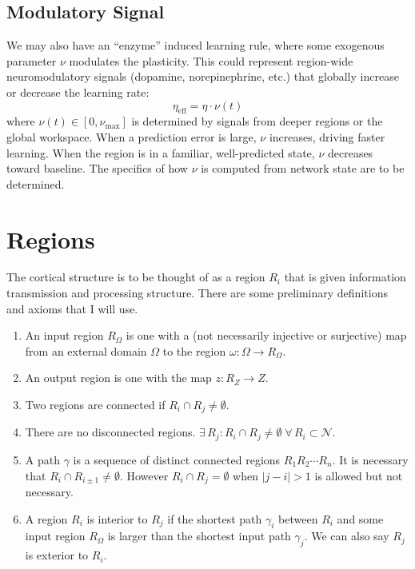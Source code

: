 \documentclass[11pt]{article}
\begin{document}
\subsection{Modulatory Signal}
We may also have an ``enzyme'' induced learning rule, where some exogenous parameter $\nu$ modulates the plasticity. This could represent region-wide neuromodulatory signals (dopamine, norepinephrine, etc.) that globally increase or decrease the learning rate:
\begin{equation}
    \eta_{\text{eff}} = \eta \cdot \nu(t)
\end{equation}
where $\nu(t) \in [0, \nu_{\max}]$ is determined by signals from deeper regions or the global workspace. When a prediction error is large, $\nu$ increases, driving faster learning. When the region is in a familiar, well-predicted state, $\nu$ decreases toward baseline. The specifics of how $\nu$ is computed from network state are to be determined.





\section{Regions}
The cortical structure is to be thought of as a region $R_i$ that is given information transmission and processing structure. There are some preliminary definitions and axioms that I will use.
\begin{enumerate}
    \item An input region $R_\Omega$ is one with a (not necessarily injective or surjective) map from an external domain $\Omega$ to the region $\omega: \Omega \to R_\Omega$.
    \item An output region is one with the map $z: R_Z \to Z$.
    \item Two regions are connected if $R_i \cap R_j \ne \emptyset$.
    \item There are no disconnected regions. $\exists\, R_j : R_i \cap R_j \ne \emptyset \;\forall\, R_i \subset \mathcal{N}$.
    \item A path $\gamma$ is a sequence of distinct connected regions $R_1 R_2 \cdots R_n$. It is necessary that $R_i \cap R_{i\pm 1} \ne \emptyset$. However $R_i \cap R_j = \emptyset$ when $|j-i| > 1$ is allowed but not necessary.
    \item A region $R_i$ is interior to $R_j$ if the shortest path $\gamma_i$ between $R_i$ and some input region $R_\Omega$ is larger than the shortest input path $\gamma_j$. We can also say $R_j$ is exterior to $R_i$.
\end{enumerate}
\end{document}
